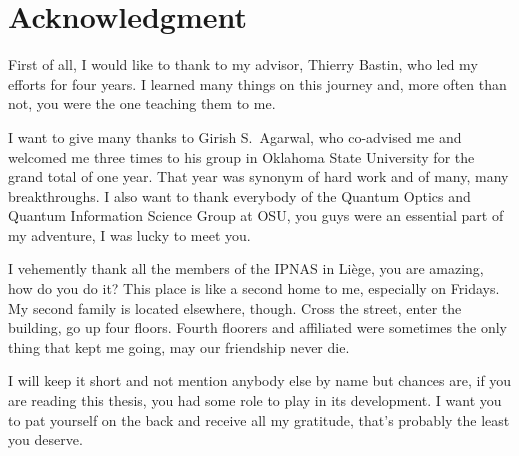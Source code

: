 \chapter*{Acknowledgment}

First of all, I would like to thank to my advisor, Thierry Bastin, who led my efforts for four years. I learned many things on this journey and, more often than not, you were the one teaching them to me.

I want to give many thanks to Girish S.~Agarwal, who co-advised me and welcomed me three times to his group in Oklahoma State University for the grand total of one year. That year was synonym of hard work and of many, many breakthroughs. I also want to thank everybody of the Quantum Optics and Quantum Information Science Group at OSU, you guys were an essential part of my adventure, I was lucky to meet you.

I vehemently thank all the members of the IPNAS in Li\`ege, you are amazing, how do you do it? This place is like a second home to me, especially on Fridays. My second family is located elsewhere, though. Cross the street, enter the building, go up four floors. Fourth floorers and affiliated were sometimes the only thing that kept me going, may our friendship never die.

I will keep it short and not mention anybody else by name but chances are, if you are reading this thesis, you had some role to play in its development. I want you to pat yourself on the back and receive all my  gratitude, that's probably the least you deserve.